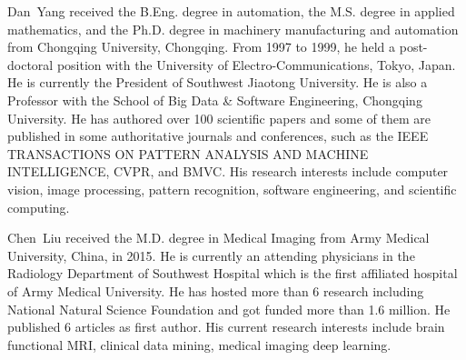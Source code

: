 \documentclass[journal]{IEEEtran}
\begin{document}
\begin{IEEEbiography}{Dan~Yang}
    received the B.Eng. degree in automation, the M.S. degree in applied mathematics, and the Ph.D. degree in machinery manufacturing and automation from Chongqing University, Chongqing. From 1997 to 1999, he held a post-doctoral position with the University of Electro-Communications, Tokyo, Japan. He is currently the President of Southwest Jiaotong University. He is also a Professor with the School of Big Data \& Software Engineering, Chongqing University. He has authored over 100 scientific papers and some of them are published in some authoritative journals and conferences, such as the IEEE TRANSACTIONS ON PATTERN ANALYSIS AND MACHINE INTELLIGENCE, CVPR, and BMVC. His research interests include computer vision, image processing, pattern recognition, software engineering,
and scientific computing.
\end{IEEEbiography}

\vspace{-0.5cm}

\begin{IEEEbiography}{Chen~Liu}
    received the M.D. degree in Medical Imaging from Army Medical University, China, in 2015. He is currently an attending physicians in the Radiology Department of Southwest Hospital which is the first affiliated hospital of Army Medical University. He has hosted more than 6 research including National Natural Science Foundation and got funded more than 1.6 million. He published 6 articles as first author. His current research interests include brain functional MRI, clinical data mining, medical imaging deep learning.
\end{IEEEbiography}
\end{document}
